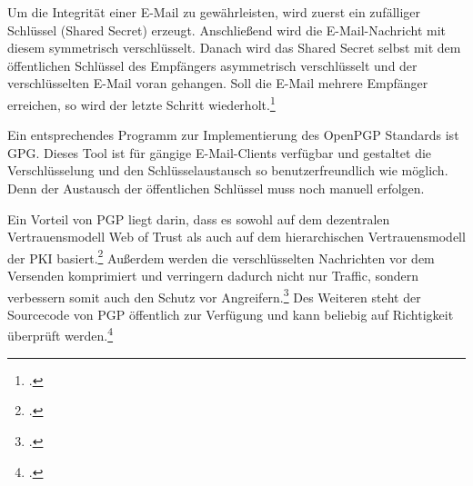\documentclass  [paper=a4,
				fontsize=12pt,
				listof=totoc,
				bibliography=totoc
				]{scrreprt}
\begin{document}
				
				Um die Integrität einer E-Mail zu gewährleisten, wird zuerst ein zufälliger Schlüssel (Shared Secret) erzeugt. Anschließend wird die E-Mail-Nachricht mit diesem symmetrisch verschlüsselt. Danach wird das Shared Secret selbst mit dem öffentlichen Schlüssel des Empfängers asymmetrisch verschlüsselt und der verschlüsselten E-Mail voran gehangen. Soll die E-Mail mehrere Empfänger erreichen, so wird der letzte Schritt wiederholt.\footcite[vgl.][S. 43]{Schwenk}
				\medskip
				
				
				Ein entsprechendes Programm zur Implementierung des OpenPGP Standards ist \ac{GPG}. Dieses Tool ist für gängige E-Mail-Clients verfügbar und gestaltet die Verschlüsselung und den Schlüsselaustausch so benutzerfreundlich wie möglich. Denn der Austausch der öffentlichen Schlüssel muss noch manuell erfolgen.
				\medskip
				
							


				
				
				
				Ein Vorteil von \ac{PGP} liegt darin, dass es sowohl auf dem dezentralen Vertrauensmodell Web of Trust als auch auf dem hierarchischen Vertrauensmodell der \ac{PKI} basiert.\footcite[Vgl.][S. 38f.]{Schwenk}
				Außerdem werden die verschlüsselten Nachrichten vor dem Versenden komprimiert und verringern dadurch nicht nur Traffic, sondern verbessern somit auch den Schutz vor Angreifern.\footcite[Vgl.][S. 45]{Schwenk}	
				Des Weiteren steht der Sourcecode von \ac{PGP} öffentlich zur Verfügung und kann beliebig auf Richtigkeit überprüft werden.\footcite[Vgl.][S. 47]{Schwenk}
				\medskip
									
\end{document}
